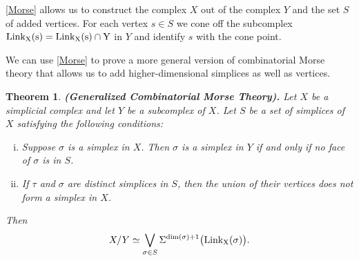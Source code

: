 \documentclass[a4paper]{amsart}
\providecommand{\Link}{\ensuremath\mr{Link}}
\numberwithin{theoremcounter}{section}
\newtheorem{theorem}[theoremauto]{Theorem}
\theoremstyle{definition}
\theoremstyle{remark}
\newcommand{\mr}[1]{{\rm #1}}
\begin{document}
\autoref{Morse} allows us to construct the complex $X$ out of the complex $Y$ and the set $S$ of added vertices. For each vertex $s \in S$ we cone off the subcomplex $\Link_X(s) = \Link_X(s)  \cap Y$ in $Y$ and identify $s$ with the cone point. 

We can use \autoref{Morse} to prove a more general version of combinatorial Morse theory that allows us to add higher-dimensional simplices as well as vertices. 

\begin{theorem}{\bf (Generalized Combinatorial Morse Theory).}  \label{Morse2} Let $X$ be a simplicial complex and let $Y$ be a  subcomplex of $X$. Let $S$ be a set of  simplices of $X$ satisfying the following conditions:
\begin{enumerate}[(i)]
\item \label{Item-Morse2i} Suppose $\sigma$ is a simplex in $X$. Then $\sigma$ is a simplex in $Y$ if and only if no face of  $\sigma$ is in $S$.
\item \label{Item-Morse2ii} If $\tau$ and $\sigma$ are distinct simplices in $S$, then the union of their vertices does not form a simplex in $X$. 
\end{enumerate}
Then $$X/Y \simeq  \bigvee_{\sigma \in S} \Sigma^{\dim(\sigma)+1} \big( \Link_X(\sigma) \big).$$ 
\end{theorem}
\end{document}
